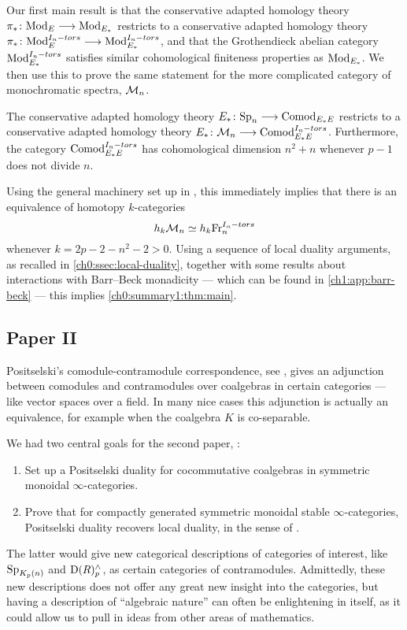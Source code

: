Our first main result is that the conservative adapted homology theory $\pi_* \colon \mathrm{Mod}_{E} \longrightarrow \mathrm{Mod}_{E_*}$ restricts to a conservative adapted homology theory $\pi_* \colon \mathrm{Mod}_{E}^{I_n-tors}\longrightarrow \mathrm{Mod}_{E_*}^{I_n-tors}$, and that the Grothendieck abelian category $\mathrm{Mod}_{E_*}^{I_n-tors}$ satisfies similar cohomological finiteness properties as $\mathrm{Mod}_{E_*}$. We then use this to prove the same statement for the more complicated category of monochromatic spectra, $\mathcal{M}_{n}$. 

\begin{theorem}
    The conservative adapted homology theory $E_*\colon \mathrm{Sp}_{n}\longrightarrow \mathrm{Comod}_{E_*E}$ restricts to a conservative adapted homology theory $E_*\colon \mathcal{M}_{n}\longrightarrow \mathrm{Comod}_{E_*E}^{I_n-tors}$. Furthermore, the category $\mathrm{Comod}_{E_*E}^{I_n-tors}$ has cohomological dimension $n^2+n$ whenever $p-1$ does not divide $n$. 
\end{theorem}

Using the general machinery set up in \cite{patchkoria-pstragowski_2021}, this immediately implies that there is an equivalence of homotopy $k$-categories
\[h_k \mathcal{M}_{n} \simeq h_k\mathrm{Fr}_{n}^{I_n-tors}\]
whenever $k= 2p-2-n^2-2>0$. Using a sequence of local duality arguments, as recalled in \cref{ch0:ssec:local-duality}, together with some results about interactions with Barr--Beck monadicity --- which can be found in \cref{ch1:app:barr-beck} --- this implies \cref{ch0:summary1:thm:main}. 




\subsection{Paper II}

Positselski's comodule-contramodule correspondence, see \citeme,  gives an adjunction between comodules and contramodules over coalgebras in certain categories --- like vector spaces over a field. In many nice cases this adjunction is actually an equivalence, for example when the coalgebra $K$ is co-separable. 

We had two central goals for the second paper, \cite{aambo_2024_positselski}: 
\begin{enumerate}
    \item Set up a Positselski duality for cocommutative coalgebras in symmetric monoidal $\infty$-categories. 
    \item Prove that for compactly generated symmetric monoidal stable $\infty$-categories, Positselski duality recovers local duality, in the sense of \citeme. 
\end{enumerate}

The latter would give new categorical descriptions of categories of interest, like $\mathrm{Sp}_{K_p(n)}$ and $\mathrm{D}(R)^\wedge_p$, as certain categories of contramodules. Admittedly, these new descriptions does not offer any great new insight into the categories, but having a description of ``algebraic nature'' can often be enlightening in itself, as it could allow us to pull in ideas from other areas of mathematics. 

